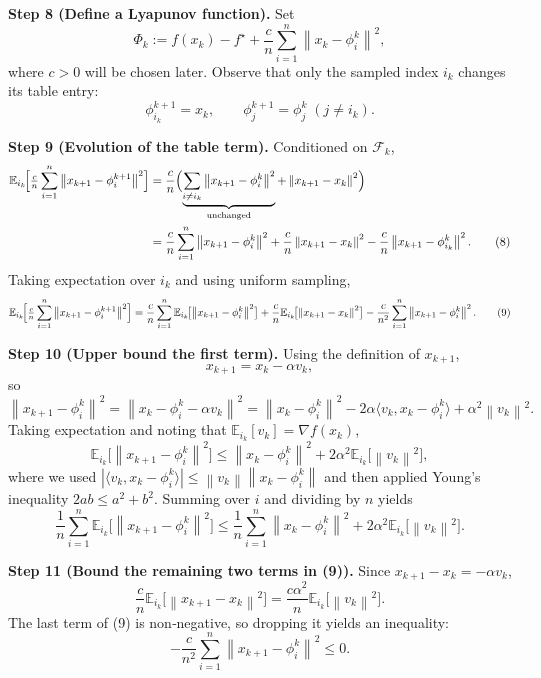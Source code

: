 \documentclass{article}
\newcommand{\E}{\mathbb{E}}
\newcommand{\norm}[1]{\left\|#1\right\|}
\newcommand{\grad}{\nabla}
\begin{document}
\noindent\textbf{Step 8 (Define a Lyapunov function).}  
Set
\[
\Phi_k := f(x_k)-f^{\star}
+\frac{c}{n}\sum_{i=1}^{n}\norm{x_k-\phi_i^{k}}^{2},
\]
where $c>0$ will be chosen later. Observe that only the sampled index $i_k$ changes its table entry:
\[
\phi_{i_k}^{k+1}=x_k,\qquad
\phi_{j}^{k+1}=\phi_{j}^{k}\;(j\neq i_k).
\]

\noindent\textbf{Step 9 (Evolution of the table term).}  
Conditioned on $\mathcal{F}_k$,
\[
\begin{aligned}
\E_{i_k}\!\Bigl[\tfrac{c}{n}\sum_{i=1}^{n}\norm{x_{k+1}-\phi_i^{k+1}}^{2}\Bigr]
&= \frac{c}{n}\Bigl(
\underbrace{\sum_{i\neq i_k}\norm{x_{k+1}-\phi_i^{k}}^{2}}_{\text{unchanged}}
+\norm{x_{k+1}-x_k}^{2}
\Bigr)\\
&= \frac{c}{n}\sum_{i=1}^{n}\norm{x_{k+1}-\phi_i^{k}}^{2}
+\frac{c}{n}\norm{x_{k+1}-x_k}^{2}
-\frac{c}{n}\norm{x_{k+1}-\phi_{i_k}^{k}}^{2}. \tag{8}
\end{aligned}
\]
Taking expectation over $i_k$ and using uniform sampling,
\[
\E_{i_k}\!\Bigl[\tfrac{c}{n}\sum_{i=1}^{n}\norm{x_{k+1}-\phi_i^{k+1}}^{2}\Bigr]
= \frac{c}{n}\sum_{i=1}^{n}\E_{i_k}\!\bigl[\norm{x_{k+1}-\phi_i^{k}}^{2}\bigr]
+\frac{c}{n}\E_{i_k}\!\bigl[\norm{x_{k+1}-x_k}^{2}\bigr]
-\frac{c}{n^{2}}\sum_{i=1}^{n}\norm{x_{k+1}-\phi_i^{k}}^{2}. \tag{9}
\]

\noindent\textbf{Step 10 (Upper bound the first term).}  
Using the definition of $x_{k+1}$,
\[
x_{k+1}=x_k-\alpha v_k,
\]
so
\[
\norm{x_{k+1}-\phi_i^{k}}^{2}
= \norm{x_k-\phi_i^{k}-\alpha v_k}^{2}
= \norm{x_k-\phi_i^{k}}^{2}
-2\alpha\langle v_k, x_k-\phi_i^{k}\rangle
+\alpha^{2}\norm{v_k}^{2}.
\]
Taking expectation and noting that $\E_{i_k}[v_k]=\grad f(x_k)$,
\[
\E_{i_k}\!\bigl[\norm{x_{k+1}-\phi_i^{k}}^{2}\bigr]
\le \norm{x_k-\phi_i^{k}}^{2}
+2\alpha^{2}\E_{i_k}\!\bigl[\norm{v_k}^{2}\bigr],
\]
where we used $|\langle v_k, x_k-\phi_i^{k}\rangle|\le \norm{v_k}\norm{x_k-\phi_i^{k}}$
and then applied Young’s inequality $2ab\le a^{2}+b^{2}$.
Summing over $i$ and dividing by $n$ yields
\[
\frac{1}{n}\sum_{i=1}^{n}\E_{i_k}\!\bigl[\norm{x_{k+1}-\phi_i^{k}}^{2}\bigr]
\le \frac{1}{n}\sum_{i=1}^{n}\norm{x_k-\phi_i^{k}}^{2}
+2\alpha^{2}\E_{i_k}\!\bigl[\norm{v_k}^{2}\bigr]. \tag{10}
\]

\noindent\textbf{Step 11 (Bound the remaining two terms in (9)).}  
Since $x_{k+1}-x_k=-\alpha v_k$,
\[
\frac{c}{n}\E_{i_k}\!\bigl[\norm{x_{k+1}-x_k}^{2}\bigr]
= \frac{c\alpha^{2}}{n}\E_{i_k}\!\bigl[\norm{v_k}^{2}\bigr]. \tag{11}
\]
The last term of (9) is non‑negative, so dropping it yields an inequality:
\[
-\frac{c}{n^{2}}\sum_{i=1}^{n}\norm{x_{k+1}-\phi_i^{k}}^{2}
\le 0. \tag{12}
\]
\end{document}
